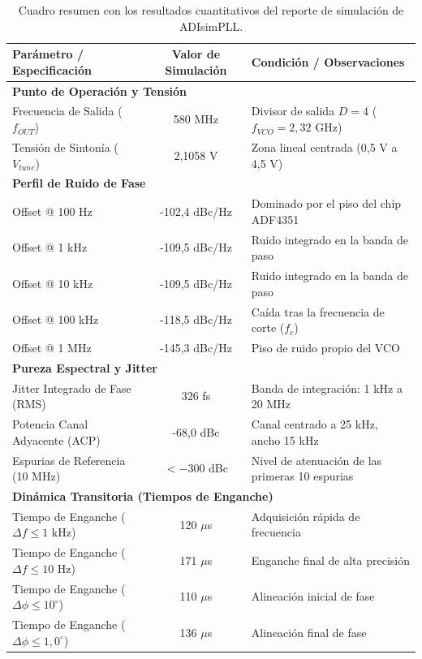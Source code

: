 \documentclass[11pt,a4paper,twoside]{report}
\begin{document}
	\begin{table}
		\centering
		\begin{tabularx}{\textwidth}{l c X}
			\toprule
			\textbf{Parámetro / Especificación} & \textbf{Valor de Simulación} & \textbf{Condición / Observaciones} \\
			\midrule
			\multicolumn{3}{l}{\textbf{Punto de Operación y Tensión}} \\
			Frecuencia de Salida ($f_{OUT}$) & 580 MHz & Divisor de salida $D = 4$ ($f_{VCO} = 2,32$ GHz) \\
			Tensión de Sintonía ($V_{tune}$) & 2,1058 V & Zona lineal centrada (0,5 V a 4,5 V) \\
			\midrule
			\multicolumn{3}{l}{\textbf{Perfil de Ruido de Fase}} \\
			Offset @ 100 Hz & -102,4 dBc/Hz & Dominado por el piso del chip ADF4351 \\
			Offset @ 1 kHz & -109,5 dBc/Hz & Ruido integrado en la banda de paso \\
			Offset @ 10 kHz & -109,5 dBc/Hz & Ruido integrado en la banda de paso \\
			Offset @ 100 kHz & -118,5 dBc/Hz & Caída tras la frecuencia de corte ($f_c$) \\
			Offset @ 1 MHz & -145,3 dBc/Hz & Piso de ruido propio del VCO \\
			\midrule
			\multicolumn{3}{l}{\textbf{Pureza Espectral y Jitter}} \\
			Jitter Integrado de Fase (RMS) & 326 fs & Banda de integración: 1 kHz a 20 MHz \\
			Potencia Canal Adyacente (ACP) & -68,0 dBc & Canal centrado a 25 kHz, ancho 15 kHz \\
			Espurias de Referencia (10 MHz) & $<-300$ dBc & Nivel de atenuación de las primeras 10 espurias \\
			\midrule
			\multicolumn{3}{l}{\textbf{Dinámica Transitoria (Tiempos de Enganche)}} \\
			Tiempo de Enganche ($\Delta f \le 1$ kHz) & 120 $\mu$s & Adquisición rápida de frecuencia \\
			Tiempo de Enganche ($\Delta f \le 10$ Hz) & 171 $\mu$s & Enganche final de alta precisión \\
			Tiempo de Enganche ($\Delta \phi \le 10^\circ$) & 110 $\mu$s & Alineación inicial de fase \\
			Tiempo de Enganche ($\Delta \phi \le 1,0^\circ$) & 136 $\mu$s & Alineación final de fase \\
			\bottomrule
		\end{tabularx}
		\caption{Cuadro resumen con los resultados cuantitativos del reporte de simulación de ADIsimPLL.}
		\label{tab:pll_resultados_simulacion}
	\end{table}
	
\end{document}
